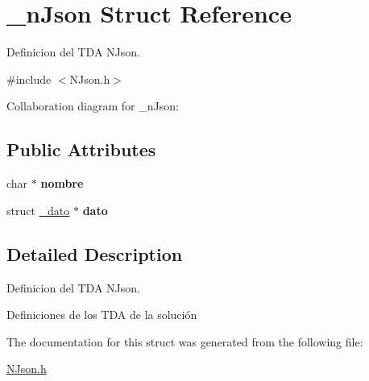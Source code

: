 \hypertarget{struct__nJson}{}\section{\+\_\+n\+Json Struct Reference}
\label{struct__nJson}


Definicion del T\+DA N\+Json.  




{\ttfamily \#include $<$N\+Json.\+h$>$}



Collaboration diagram for \+\_\+n\+Json\+:
\subsection*{Public Attributes}
\begin{DoxyCompactItemize}
\item 
char $\ast$ {\bfseries nombre}\hypertarget{struct__nJson_af0e65345b5dc1b03f495c6ad99decf6e}{}\label{struct__nJson_af0e65345b5dc1b03f495c6ad99decf6e}

\item 
struct \hyperlink{struct__dato}{\+\_\+dato} $\ast$ {\bfseries dato}\hypertarget{struct__nJson_a39aa435b6e91cac33cf575d0d98ab5e1}{}\label{struct__nJson_a39aa435b6e91cac33cf575d0d98ab5e1}

\end{DoxyCompactItemize}


\subsection{Detailed Description}
Definicion del T\+DA N\+Json. 

Definiciones de los T\+DA de la solución 

The documentation for this struct was generated from the following file\+:\begin{DoxyCompactItemize}
\item 
\hyperlink{NJson_8h}{N\+Json.\+h}\end{DoxyCompactItemize}
